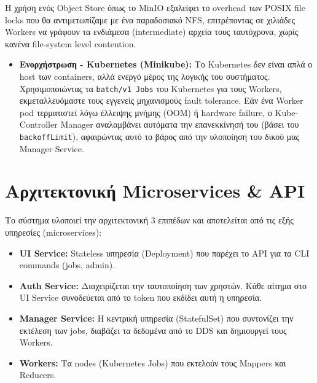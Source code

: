 \documentclass[11pt, a4paper]{article}
\begin{document}
\begin{tcolorbox}[colback=LightBlue, colframe=PrimaryColor, title=\textbf{Σχεδιαστική Απόφαση: Αποφυγή POSIX Locks}, arc=4mm]
Η χρήση ενός Object Store όπως το MinIO εξαλείφει το overhead των POSIX file locks που θα αντιμετωπίζαμε με ένα παραδοσιακό NFS, επιτρέποντας σε χιλιάδες Workers να γράφουν τα ενδιάμεσα (intermediate) αρχεία τους ταυτόχρονα, χωρίς κανένα file-system level contention.
\end{tcolorbox}

\begin{itemize}
    \item \textbf{Ενορχήστρωση - Kubernetes (Minikube):} Το Kubernetes δεν είναι απλά ο host των containers, αλλά ενεργό μέρος της λογικής του συστήματος. Χρησιμοποιώντας τα \texttt{batch/v1 Jobs} του Kubernetes για τους Workers, εκμεταλλευόμαστε τους εγγενείς μηχανισμούς fault tolerance. Εάν ένα Worker pod τερματιστεί λόγω έλλειψης μνήμης (OOM) ή hardware failure, ο Kube-Controller Manager αναλαμβάνει αυτόματα την επανεκκίνησή του (βάσει του \texttt{backoffLimit}), αφαιρώντας αυτό το βάρος από την υλοποίηση του δικού μας Manager Service.
\end{itemize}

\section{Αρχιτεκτονική Microservices \& API}
Το σύστημα υλοποιεί την αρχιτεκτονική 3 επιπέδων και αποτελείται από τις εξής υπηρεσίες (microservices):
\begin{itemize}
    \item \textbf{UI Service:} Stateless υπηρεσία (Deployment) που παρέχει το API για τα CLI commands (jobs, admin).
    \item \textbf{Auth Service:} Διαχειρίζεται την ταυτοποίηση των χρηστών. Κάθε αίτημα στο UI Service συνοδεύεται από το token που εκδίδει αυτή η υπηρεσία.
    \item \textbf{Manager Service:} Η κεντρική υπηρεσία (StatefulSet) που συντονίζει την εκτέλεση των jobs, διαβάζει τα δεδομένα από το DDS και δημιουργεί τους Workers.
    \item \textbf{Workers:} Τα nodes (Kubernetes Jobs) που εκτελούν τους Mappers και Reducers.
\end{itemize}
\end{document}
